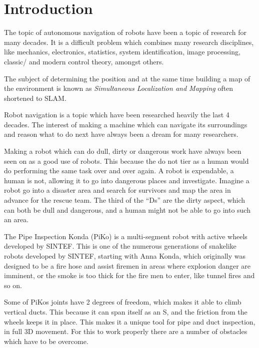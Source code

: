 
\chapter{Introduction}
The topic of autonomous navigation of robots have been a topic of research for many
decades. It is a difficult problem which combines many research disciplines, like 
mechanics, electronics, statistics, system identification, image processing, classic/ and
modern control theory, amongst others.

The subject of determining the position and at the same time building a map of
the environment is known as \emph{Simultaneous Localization and Mapping} often shortened
to SLAM. 






Robot navigation is a topic which have been researched heavily the last 4 decades. The
interest of making a machine which can navigate its surroundings and reason what to do
next have always been a dream for many researchers. 

Making a robot which can do dull, dirty  or dangerous work have always been seen on as a
good use of robots. This because the do not tier as a human would do performing the same
task over and over again. A robot is expendable, a human is not, allowing it to go into
dangerous places and investigate. Imagine a robot go into a disaster area and search for
survivors and map the area in advance for the rescue team. The third of the ``Ds'' are the
dirty aspect, which can both be dull and dangerous, and a human might not be able to go
into such an area. 

The Pipe Inspection Konda (PiKo)\cite{piko} is a multi-segment robot with active wheels developed by
SINTEF. This is one of the numerous generations of snakelike robots
developed by SINTEF, starting with Anna Konda, which originally was designed to be a fire
hose and assist firemen in areas where explosion danger are imminent, or the smoke is too
thick for the fire men to enter, like tunnel fires and so on. 

Some of PiKos joints have 2 degrees of freedom, which makes it able to climb vertical ducts. This
because it can span itself as an S, and the friction from the wheels keeps it in place.
This makes it a unique tool for pipe and duct inspection, in full 3D movement. 
For this to work properly there are a number of obstacles which have to be overcome. 

